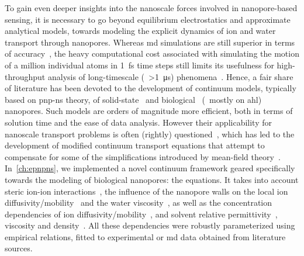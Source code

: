 To gain even deeper insights into the nanoscale forces involved in nanopore-based sensing, it is necessary to
go beyond equilibrium electrostatics and approximate analytical models, towards modeling the explicit dynamics
of ion and water transport through nanopores. Whereas \gls{md} simulations are still superior in terms of
accuracy~\cite{Aksimentiev-2005,DeBiase-2016,Basdevant-2019}, the heavy computational cost associated with
simulating the motion of a million individual atoms in \SI{1}{\fs} time steps still limits its usefulness for
high-throughput analysis of long-timescale (\ie~\SI{>1}{\us}) phenomena~\cite{Vendruscolo-2011,Phillips-2020}.
Hence, a fair share of literature has been devoted to the development of continuum models, typically based on
\gls{pnp-ns} theory, of
solid-state~\cite{Daiguji-2004,Cervera-2005,White-2008,Lu-2012,Chaudhry-2014,Laohakunakorn-2015,Hulings-2018,Rigo-2019,Melnikov-2020}
and
biological~\cite{Noskov-2004,Cozmuta-2005,OKeeffe-2007,Simakov-2010,Pederson-2015,Simakov-2018,Aguilella-Arzo-2020}
(\ie~mostly on \gls{ahl}) nanopores. Such models are orders of magnitude more efficient, both in terms of
solution time and the ease of data analysis. However their applicability for nanoscale transport problems is
often (rightly) questioned~\cite{Corry-2000,Collins-2012}, which has led to the development of modified
continuum transport equations that attempt to compensate for some of the simplifications introduced by
mean-field
theory~\cite{Noskov-2004,Baldessari-2008-1,Daiguji-2010,Simakov-2010,Lu-2011,Burger-2012,Chen-2016,Liu-2020}.
In~\cref{ch:epnpns}, we implemented a novel continuum framework geared specifically towards the modeling of
biological nanopores: the  equations. It takes into account steric ion-ion
interactions~\cite{Daiguji-2010,Kilic-2007,Lu-2011,Liu-2020}, the influence of the nanopore walls on the local
ion diffusivity/mobility~\cite{Makarov-1998,Noskov-2004,Pederson-2015,Hulings-2018,Wilson-2019} and the water
viscosity~\cite{Pronk-2014,Vo-2016,Hsu-2017}, as well as the concentration dependencies of ion
diffusivity/mobility~\cite{Baldessari-2008-1,Burger-2012}, and solvent relative permittivity~\cite{Chen-2016},
viscosity and density~\cite{Hai-Lang-1996}. All these dependencies were robustly parameterized using empirical
relations, fitted to experimental or \gls{md} data obtained from literature sources.

